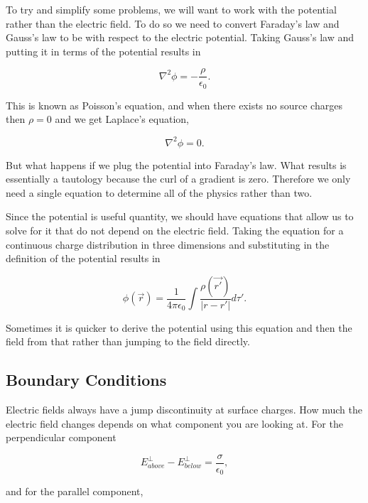 \documentclass[preprint, review,12pt]{elsarticle}
\begin{document}
To try and simplify some problems, we will want to work with the potential rather than the electric field. To do so we need to convert Faraday's law and Gauss's law to be with respect to the electric potential. Taking Gauss's law and putting it in terms of the potential results in

\begin{equation}
    \nabla^2 \phi = -\frac{\rho}{\epsilon_0}.
\end{equation}

This is known as Poisson's equation, and when there exists no source charges then $\rho = 0$ and we get Laplace's equation,

\begin{equation}
    \nabla^2 \phi = 0.
\end{equation}

But what happens if we plug the potential into Faraday's law. What results is essentially a tautology because the curl of a gradient is zero. Therefore we only need a single equation to determine all of the physics rather than two.

Since the potential is useful quantity, we should have equations that allow us to solve for it that do not depend on the electric field. Taking the equation for a continuous charge distribution in three dimensions and substituting in the definition of the potential results in

\begin{equation}
    \phi(\vec{r}) = \frac{1}{4 \pi \epsilon_0} \int \frac{\rho(\vec{r'})}{|r-r'|}d\tau'.
\end{equation}

Sometimes it is quicker to derive the potential using this equation and then the field from that rather than jumping to the field directly. 

\subsection{Boundary Conditions}

Electric fields always have a jump discontinuity at surface charges. How much the electric field changes depends on what component you are looking at. For the perpendicular component

\begin{equation}
    E_{above}^\bot - E_{below}^\bot = \frac{\sigma}{\epsilon_0},
\end{equation}

and for the parallel component,
\end{document}
